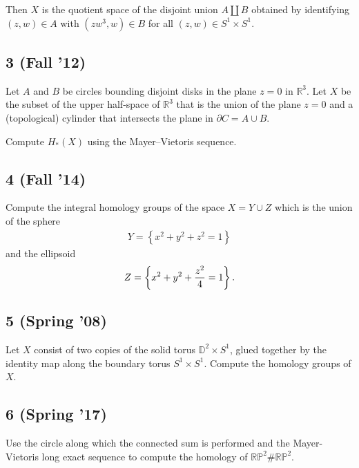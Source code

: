 Then \(X\) is the quotient space of the disjoint union
\(A {\textstyle\coprod}B\) obtained by identifying \((z, w) \in A\) with
\((zw^3 , w) \in B\) for all \((z, w) \in S^1 \times S^1\).

\hypertarget{fall-12-2}{%
\subsection{3 (Fall '12)}\label{fall-12-2}}

Let \(A\) and \(B\) be circles bounding disjoint disks in the plane
\(z = 0\) in \({\mathbb{R}}^3\). Let \(X\) be the subset of the upper
half-space of \({\mathbb{R}}^3\) that is the union of the plane
\(z = 0\) and a (topological) cylinder that intersects the plane in
\(\partial C = A \cup B\).

Compute \(H_* (X)\) using the Mayer--Vietoris sequence.

\hypertarget{fall-14-5}{%
\subsection{4 (Fall '14)}\label{fall-14-5}}

Compute the integral homology groups of the space \(X = Y \cup Z\) which
is the union of the sphere
\begin{align*}
Y = \left\{{x^2 + y^2 + z^2 = 1}\right\}
\end{align*}
and the ellipsoid
\begin{align*}
Z =  \left\{{x^2 + y^2 + {z^2 \over 4} = 1}\right\}
.\end{align*}

\hypertarget{spring-08-3}{%
\subsection{5 (Spring '08)}\label{spring-08-3}}

Let \(X\) consist of two copies of the solid torus
\({\mathbb{D}}^2 \times S^1\), glued together by the identity map along
the boundary torus \(S^1 \times S^1\). Compute the homology groups of
\(X\).

\hypertarget{spring-17-2}{%
\subsection{6 (Spring '17)}\label{spring-17-2}}

Use the circle along which the connected sum is performed and the
Mayer-Vietoris long exact sequence to compute the homology of
\({\mathbb{RP}}^2 \# {\mathbb{RP}}^2\).

